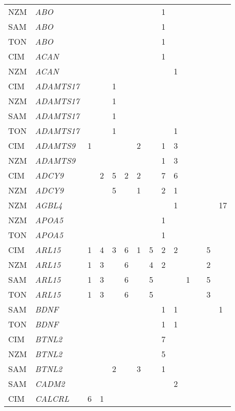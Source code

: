 \documentclass[twoside,openright]{report}
\begin{document}
\begin{ThreePartTable}
\begin{longtable}[t]{llllllllllllll}
NZM & \em{ABO} &  &  &  &  &  &  & 1 &  &  &  &  & \\
SAM & \em{ABO} &  &  &  &  &  &  & 1 &  &  &  &  & \\
TON & \em{ABO} &  &  &  &  &  &  & 1 &  &  &  &  & \\
CIM & \em{ACAN} &  &  &  &  &  &  & 1 &  &  &  &  & \\
NZM & \em{ACAN} &  &  &  &  &  &  &  & 1 &  &  &  & \\
CIM & \em{ADAMTS17} &  &  & 1 &  &  &  &  &  &  &  &  & \\
NZM & \em{ADAMTS17} &  &  & 1 &  &  &  &  &  &  &  &  & \\
SAM & \em{ADAMTS17} &  &  & 1 &  &  &  &  &  &  &  &  & \\
TON & \em{ADAMTS17} &  &  & 1 &  &  &  &  & 1 &  &  &  & \\
CIM & \em{ADAMTS9} & 1 &  &  &  & 2 &  & 1 & 3 &  &  &  & \\
NZM & \em{ADAMTS9} &  &  &  &  &  &  & 1 & 3 &  &  &  & \\
CIM & \em{ADCY9} &  & 2 & 5 & 2 & 2 &  & 7 & 6 &  &  &  & \\
NZM & \em{ADCY9} &  &  & 5 &  & 1 &  & 2 & 1 &  &  &  & \\
NZM & \em{AGBL4} &  &  &  &  &  &  &  & 1 &  &  &  & 17\\
NZM & \em{APOA5} &  &  &  &  &  &  & 1 &  &  &  &  & \\
TON & \em{APOA5} &  &  &  &  &  &  & 1 &  &  &  &  & \\
CIM & \em{ARL15} & 1 & 4 & 3 & 6 & 1 & 5 & 2 & 2 &  &  & 5 & \\
NZM & \em{ARL15} & 1 & 3 &  & 6 &  & 4 & 2 &  &  &  & 2 & \\
SAM & \em{ARL15} & 1 & 3 &  & 6 &  & 5 &  &  & 1 &  & 5 & \\
TON & \em{ARL15} & 1 & 3 &  & 6 &  & 5 &  &  &  &  & 3 & \\
SAM & \em{BDNF} &  &  &  &  &  &  & 1 & 1 &  &  &  & 1\\
TON & \em{BDNF} &  &  &  &  &  &  & 1 & 1 &  &  &  & \\
CIM & \em{BTNL2} &  &  &  &  &  &  & 7 &  &  &  &  & \\
NZM & \em{BTNL2} &  &  &  &  &  &  & 5 &  &  &  &  & \\
SAM & \em{BTNL2} &  &  & 2 &  & 3 &  & 1 &  &  &  &  & \\
SAM & \em{CADM2} &  &  &  &  &  &  &  & 2 &  &  &  & \\
CIM & \em{CALCRL} & 6 & 1 &  &  &  &  &  &  &  &  &  & \\

\end{longtable}
\end{ThreePartTable}
\end{document}
